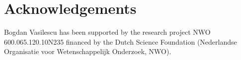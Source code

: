 
\section{Acknowledgements}
\label{sec:acknowledgements}

Bogdan Vasilescu has been supported by the research project NWO 600.065.120.10N235 financed by the 
Dutch Science Foundation (Nederlandse Organisatie voor Wetenschappelijk Onderzoek, NWO).